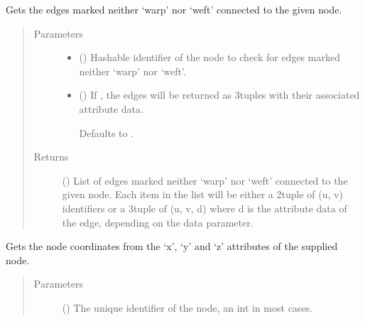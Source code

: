 \documentclass[letterpaper,10pt,english]{sphinxmanual}
\begin{document}
\begin{fulllineitems}
\begin{fulllineitems}
\label{\detokenize{cockatoo:cockatoo.KnitNetworkBase.node_contour_edges}}
Gets the edges marked neither ‘warp’ nor ‘weft’ connected to the
given node.
\begin{quote}\begin{description}
\item[{Parameters}] \leavevmode\begin{itemize}
\item {} 
 () \textendash{} Hashable identifier of the node to check for edges marked neither
‘warp’ nor ‘weft’.

\item {} 
 (\sphinxstyleliteralemphasis{\sphinxupquote{, }}) \textendash{} 
If , the edges will be returned as 3\sphinxhyphen{}tuples with their
associated attribute data.

Defaults to .


\end{itemize}

\item[{Returns}] \leavevmode
{} () \textendash{} List of edges marked neither ‘warp’ nor ‘weft’ connected to the
given node. Each item in the list will be either a 2\sphinxhyphen{}tuple of (u, v)
identifiers or a 3\sphinxhyphen{}tuple of (u, v, d) where d is the attribute data
of the edge, depending on the data parameter.

\end{description}\end{quote}

\end{fulllineitems}


\begin{fulllineitems}
\label{\detokenize{cockatoo:cockatoo.KnitNetworkBase.node_coordinates}}
Gets the node coordinates from the ‘x’, ‘y’ and ‘z’ attributes of the
supplied node.
\begin{quote}\begin{description}
\item[{Parameters}] \leavevmode
{} () \textendash{} The unique identifier of the node, an int in most cases.


\end{description}
\end{quote}
\end{fulllineitems}
\end{fulllineitems}
\end{document}
